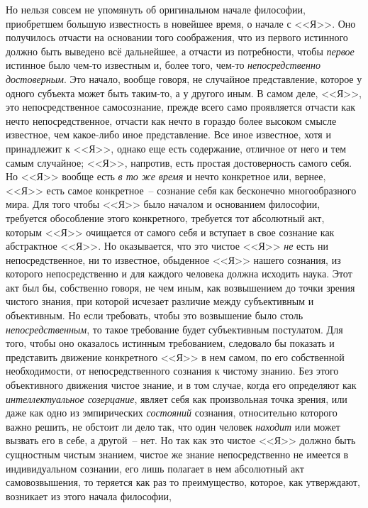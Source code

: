 Но нельзя совсем не упомянуть об оригинальном начале
философии, приобретшем большую известность в новейшее
время, о начале с <<Я>>.
Оно получилось отчасти
на основании того соображения, что из первого истинного
должно быть выведено всё дальнейшее, а отчасти из
потребности, чтобы \emph{первое} истинное было чем-то известным
и, более того, чем-то \emph{непосредственно достоверным}.
Это начало, вообще говоря, не случайное представление,
которое у одного субъекта может быть таким-то, а у другого
иным. В самом деле, <<Я>>, это непосредственное самосознание,
прежде всего само проявляется отчасти как
нечто непосредственное, отчасти как нечто в гораздо более
высоком смысле известное, чем какое-либо иное представление.
Все иное известное, хотя и принадлежит
к <<Я>>, однако еще есть содержание, отличное от него
и тем самым случайное; <<Я>>, напротив, есть простая достоверность
самого себя. Но <<Я>> вообще есть \emph{в то же
время} и нечто конкретное или, вернее, <<Я>> есть самое
конкретное~-- сознание себя как бесконечно многообразного
мира. Для того чтобы <<Я>> было началом и основанием
философии, требуется обособление этого конкретного,
требуется тот абсолютный акт, которым <<Я>> очищается
от самого себя и вступает в свое сознание как
абстрактное <<Я>>. Но оказывается, что это чистое <<Я>> \emph{не}
есть ни непосредственное, ни то известное, обыденное
<<Я>> нашего сознания, из которого непосредственно и для
каждого человека должна исходить наука. Этот акт был
бы, собственно говоря, не чем иным, как возвышением
до точки зрения чистого знания, при которой исчезает
различие между субъективным и объективным. Но если
требовать, чтобы это возвышение было столь \emph{непосредственным},
то такое требование будет субъективным постулатом.
Для того, чтобы оно оказалось истинным требованием,
следовало бы показать и представить движение
конкретного <<Я>> в нем самом, по его собственной необходимости,
от непосредственного сознания к чистому знанию.
Без этого объективного движения чистое знание, и
в том случае, когда его определяют как \emph{интеллектуальное
созерцание}, являет себя как произвольная точка зрения,
или даже как одно из эмпирических \emph{состояний} сознания,
относительно которого важно решить, не обстоит
ли дело так, что один человек \emph{находит} или может вызвать
его в себе, а другой~-- нет. Но так как это чистое
<<Я>> должно быть сущностным чистым знанием, чистое
же знание непосредственно не имеется в индивидуальном
сознании, его лишь полагает в нем абсолютный акт
самовозвышения, то теряется как раз то преимущество,
которое, как утверждают, возникает из этого начала философии,
